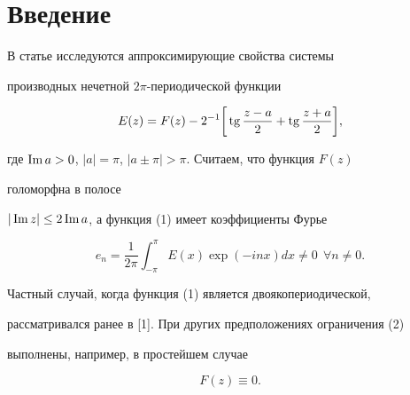  




\maketitle 


\label{begin} 


 


 


\section*{Введение} 


 


В статье исследуются аппроксимирующие свойства системы  


производных нечетной $2\pi$-периодической функции 


\begin{equation} 


E(z)=F(z)-2^{-1}\bigg[\tg\frac{z-a}{2}+\tg\frac{z+a}{2} 


\bigg], 


\end{equation} 


где $\operatorname{Im} a>0$, $|a|=\pi$, $|a\pm\pi|>\pi$. Считаем, что функция $F(z)$ 


голоморфна в полосе 


$|\operatorname{Im} z|\le2\operatorname{Im} a$, а функция (1) имеет коэффициенты Фурье 


\begin{equation} 


e_n=\frac{1}{2\pi}\int^\pi_{-\pi}E(x)\exp(-in x)d x\ne0\ \ \forall 


n\ne0. 


\end{equation} 


Частный случай, когда функция (1) является двоякопериодической,  


рассматривался ранее в [1]. При других предположениях ограничения (2)  


выполнены, например, в простейшем случае 


\begin{equation} 


F(z)\equiv0. 


\end{equation} 


